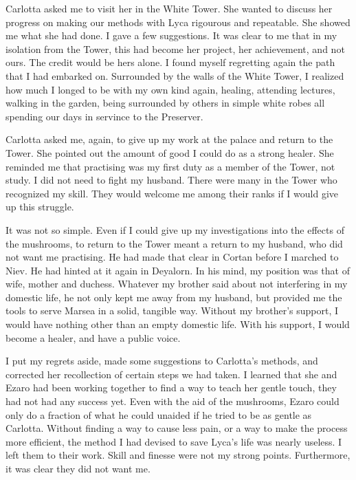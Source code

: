 \documentclass{article}
\begin{document}
Carlotta asked me to visit her in the White Tower. She wanted to discuss her progress on making our methods with Lyca rigourous and repeatable. She showed me what she had done. I gave a few suggestions. It was clear to me that in my isolation from the Tower, this had become her project, her achievement, and not ours.  The credit would be hers alone. I found myself regretting again the path that I had embarked on. Surrounded by the walls of the White Tower, I realized how much I longed to be with my own kind again, healing, attending lectures, walking in the garden, being surrounded by others in simple white robes all spending our days in servince to the Preserver. 

Carlotta asked me, again, to give up my work at the palace and return to the Tower. She pointed out the amount of good I could do as a strong healer. She reminded me that practising was my first duty as a member of the Tower, not study. I did not need to fight my husband. There were many in the Tower who recognized my skill. They would welcome me among their ranks if I would give up this struggle. 

It was not so simple. Even if I could give up my investigations into the effects of the mushrooms, to return to the Tower meant a return to my husband, who did not want me practising. He had made that clear in Cortan before I marched to Niev. He had hinted at it again in Deyalorn. In his mind, my position was that of wife, mother and duchess. Whatever my brother said about not interfering in my domestic life, he not only kept me away from my husband, but provided me the tools to serve Marsea in a solid, tangible way. Without my brother's support, I would have nothing other than an empty domestic life. With his support, I would become a healer, and have a public voice. 

I put my regrets aside, made some suggestions to Carlotta's methods, and corrected her recollection of certain steps we had taken. I learned that she and Ezaro had been working together to find a way to teach her gentle touch, they had not had any success yet. Even with the aid of the mushrooms, Ezaro could only do a fraction of what he could unaided if he tried to be as gentle as Carlotta. Without finding a way to cause less pain, or a way to make the process more efficient, the method I had devised to save Lyca's life was nearly useless. I left them to their work. Skill and finesse were not my strong points. Furthermore, it was clear they did not want me. 
\end{document}
